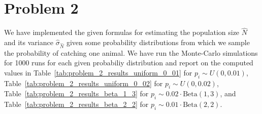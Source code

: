 

\pagebreak
\section{Problem 2}


We have implemented the given formulas for estimating the population size $\hat{N}$ and its variance $\hat{\sigma}_{\hat{N}}$ given some probability distributions from which we sample the probability of catching one animal. 
We have run the Monte-Carlo simulations for 1000 runs for each given probabiliy distribution and report on the computed values in Table~\ref{tab:problem_2_results_uniform_0_01} for $p_i \sim U(0, 0.01)$, Table~\ref{tab:problem_2_results_uniform_0_02} for $p_i \sim U(0, 0.02)$, Table~\ref{tab:problem_2_results_beta_1_3} for $p_i \sim 0.02 \cdot \mathrm{Beta}(1, 3)$, and Table~\ref{tab:problem_2_results_beta_2_2} for $p_i \sim 0.01 \cdot \mathrm{Beta}(2, 2)$.

